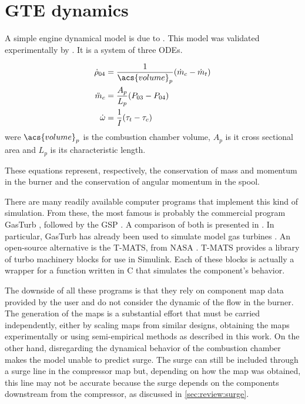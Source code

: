 \section{\Acl{GTE} dynamics}
\label{sec:review:dynamics}

A simple engine dynamical model  is due to \textcite{Fink1992}. 
This model was validated experimentally by \textcite{Gravdahl2004}.
It is a system of three \acp{ODE}.

\begin{align}
    \dot{\rho}_{04} &= \frac{1}{\acs{volume}_p}(\dot{m}_c - \dot{m}_t) \label{eqn:dyn:mass}\\
    \ddot{m}_c &= \frac{A_p}{L_p}(P_{03}-P_{04}) \label{eqn:dyn:density}\\
    \dot{\omega} &= \frac{1}{I} (\tau_t-\tau_c) \label{eqn:dyn:momentum}
\end{align}
were $\acs{volume}_p$ is the combustion chamber volume, $A_p$ is it cross sectional area and $L_p$ is its characteristic length.

These equations represent, respectively, 
the conservation of mass and momentum in the burner
and the conservation of angular momentum in the spool.

There are many readily available computer programs that implement this kind of simulation. 
From these, the most famous is probably the commercial program GasTurb \cite{GasTurb}, 
 
followed by the \gls{GSP} \cite{Visser2000}.
A comparison of both is presented in \textcite{GasTurbvsGSP}.
In particular, GasTurb has already been used to simulate model gas turbines 
\cite{gao2011modelling}.
An open-source alternative is the \gls{T-MATS}, from NASA \cite{T-MATS}.
\gls{T-MATS} provides a library of turbo machinery blocks for use in Simulink. 
Each of these blocks is actually a wrapper for a function written in C 
that simulates the component's behavior.

The downside of all these programs is that they rely on component map data provided by the user 
and do not consider the dynamic of the flow in the burner.
The generation of the maps is a substantial effort that must be carried independently, 
either by scaling maps from similar designs, obtaining the maps experimentally 
or using semi-empirical methods as described in this work. 
On the other hand, disregarding the dynamical behavior of the combustion chamber makes the model unable to predict surge. The surge can still be included through a surge line in the compressor map but,
depending on how the map was obtained, this line may not be accurate because the surge depends on the components downstream from the compressor, as discussed in \cref{sec:review:surge}.

